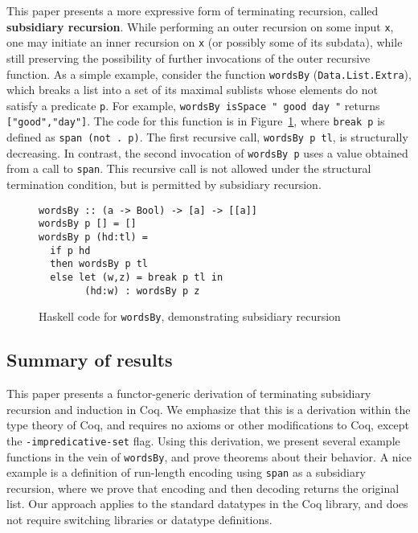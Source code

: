 \documentclass[a4paper,USenglish]{lipics-v2021}
\begin{document}
This paper presents a more expressive form of terminating recursion,
called \textbf{subsidiary recursion}.  While performing an outer
recursion on some input \verb|x|, one may initiate an inner recursion
on \verb|x| (or possibly some of its subdata), while still preserving
the possibility of further invocations of the outer recursive
function.  As a simple example, consider the function \verb|wordsBy|
(\verb|Data.List.Extra|), which breaks a list into a set of its
maximal sublists whose elements do not satisfy a predicate \verb|p|.
For example, \verb|wordsBy isSpace " good day "| returns
\verb|["good","day"]|. The code for this function is in
Figure~\ref{fig:wordsBy}, where \verb|break p| is defined as
\verb|span (not . p)|. The first recursive call, \verb|wordsBy p tl|,
is structurally decreasing. In contrast, the second invocation of
\verb|wordsBy p| uses a value obtained from a call to \verb|span|.
This recursive call is not allowed under the structural termination
condition, but is permitted by subsidiary recursion.

\begin{figure}
\begin{verbatim}
wordsBy :: (a -> Bool) -> [a] -> [[a]]
wordsBy p [] = []
wordsBy p (hd:tl) =
  if p hd
  then wordsBy p tl
  else let (w,z) = break p tl in
        (hd:w) : wordsBy p z
\end{verbatim}
\caption{Haskell code for \texttt{wordsBy}, demonstrating subsidiary recursion}
\label{fig:wordsBy}
\end{figure}

\subsection{Summary of results}

This paper presents a functor-generic derivation of terminating
subsidiary recursion and induction in Coq.  We emphasize that this is
a derivation within the type theory of Coq, and requires no axioms or
other modifications to Coq, except the \verb|-impredicative-set|
flag. Using this derivation, we present several example functions in
the vein of \verb|wordsBy|, and prove theorems about their behavior.  A nice
example is a definition of run-length encoding using \verb|span| as a
subsidiary recursion, where we prove that encoding and then decoding
returns the original list.  Our approach applies to the standard
datatypes in the Coq library, and does not require switching libraries
or datatype definitions.
\end{document}
